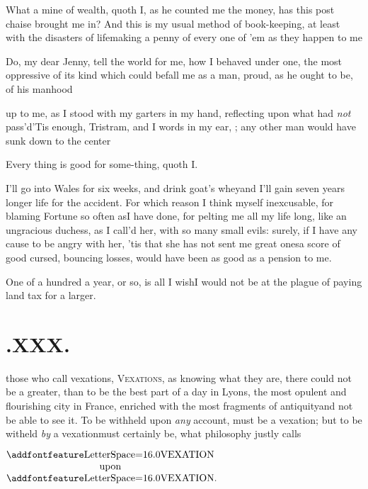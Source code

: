 \documentclass{article}
\begin{document}
\tsh What a mine of wealth, quoth I, as\break
he counted me the money, has this post chaise brought me in? And
this is my usual method of book-keeping, at least with the
disasters of life\tsk making a penny of every one of ’em as they
happen to me\tsh

\tsh Do, my dear Jenny, tell the\break
world for me, how I behaved under one,\break
the most oppressive of its kind which\break
could befall me as a man, proud, as he\break
ought to be, of his manhood\tsh

\break
up to me, as I stood with my garters in\break
my hand, reflecting upon what had \textit{not}\break
pass’d\tsh ’Tis enough, Tristram, and I\break
{}\break
words in my ear,   \break
{} ;\tsk{}  
\tsh any other man would have sunk down
to the center\tsh

\tsh Every thing is good for some-\break thing, quoth I.

\tsh I’ll go into Wales for six weeks, and drink goat’s whey\tsk and I’ll gain seven
years longer life for the accident. For which reason I think myself inexcusable, for
blaming Fortune so often as\break I have done, for pelting me all my life long, like an
ungracious duchess, as I call’d her, with so many small evils: sure\-ly, if I have any
cause to be angry with her, ’tis that she has not sent me great ones\tsk a score of
good cursed, bouncing losses, would have been as good as a pension to me.

\tsh One of a hundred a year, or so, is all I wish\tsk I would not be at the plague of
paying land tax for a larger.

\section{.\enspace XXX.}

 those who call vexations,\break
\textsc{Vexations}, as knowing what\break
they are, there could not be a greater,\break
than to be the best part of a day in Lyons, the most
opulent and flourishing city in France, enriched with the most fragments of
antiquity\tsk and not be able to see it. To be withheld upon \textit{any} account,
must be a vexation; but to be witheld \textit{by} a
vexation\tsh must certainly\break
be, what philosophy justly calls

\medskip
\centerline{$\vcenter{\halign{\hss # \hss\cr
\lss{VEXATION}\cr
upon\cr
\lss{VEXATION}\rlap{.}\cr}}$}
\eject
\end{document}
